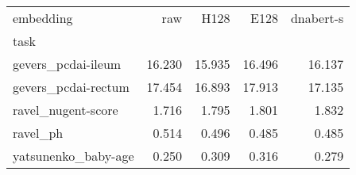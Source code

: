 \begin{tabular}{lrrrr}
\toprule
embedding & raw & H128 & E128 & dnabert-s \\
task &  &  &  &  \\
\midrule
gevers_pcdai-ileum & 16.230 & 15.935 & 16.496 & 16.137 \\
gevers_pcdai-rectum & 17.454 & 16.893 & 17.913 & 17.135 \\
ravel_nugent-score & 1.716 & 1.795 & 1.801 & 1.832 \\
ravel_ph & 0.514 & 0.496 & 0.485 & 0.485 \\
yatsunenko_baby-age & 0.250 & 0.309 & 0.316 & 0.279 \\
\bottomrule
\end{tabular}
